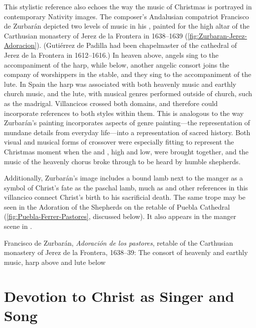 This stylistic reference also echoes the way the music of Christmas is portrayed
in contemporary Nativity images.
The composer's Andalusian compatriot Francisco de Zurbarán depicted two levels
of music in his , painted for the high altar
of the Carthusian monastery of Jerez de la Frontera in 1638--1639
(\cref{fig:Zurbaran-Jerez-Adoracion}).
(Gutiérrez de Padilla had been chapelmaster of the cathedral of Jerez de la
Frontera in 1612--1616.)%
    \Autocite{Gembero:Padilla}
In heaven above, angels sing to the accompaniment of the harp, while below,
another angelic consort joins the company of worshippers in the stable, and they
sing to the accompaniment of the lute.
In Spain the harp was associated with both heavenly music and earthly church
music, and the lute, with musical genres performed outside of church, such as
the madrigal.
Villancicos crossed both domains, and therefore could incorporate references to
both styles within them.
This is analogous to the way Zurbarán's painting incorporates aspects of genre
painting---the representation of mundane details from everyday life---into a
representation of sacred history.%
    \Autocites[31]{Sanchez:Zurbaran}{Cherry:Bodegon}{Haraszti-Takacs:Genre}
Both visual and musical forms of crossover were especially fitting to represent
the Christmas moment when the  and , high and low,
were brought together, and the music of the heavenly chorus broke through to be
heard by humble shepherds.%
\begin{Footnote}
    Additionally, Zurbarán's image includes a bound lamb next to the manger as a
    symbol of Christ's fate as the paschal lamb, much as  and other references in this villancico connect Christ's birth
    to his sacrificial death.
    The same trope may be seen in the Adoration of the Shepherds on the retable
    of Puebla Cathedral (\cref{fig:Puebla-Ferrer-Pastores}, discussed below).
    It also appears in the manger scene in
    \autocite[168]{Catholic:Breviarium1631}.
\end{Footnote}

{Francisco de Zurbarán, \emph{Adoración de los pastores}, retable of the
Carthusian monastery of Jerez de la Frontera, 1638--39: The consort of heavenly
and earthly music, harp above and lute below}

\section{Devotion to Christ as Singer and Song}


